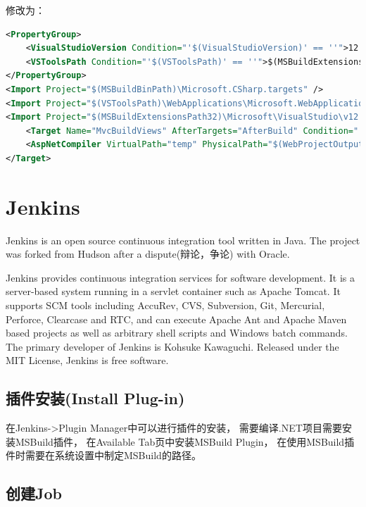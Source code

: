 \documentclass{book}
\begin{document}
修改为：

\begin{lstlisting}[language=XML]
<PropertyGroup>
	<VisualStudioVersion Condition="'$(VisualStudioVersion)' == ''">12.0</VisualStudioVersion>
	<VSToolsPath Condition="'$(VSToolsPath)' == ''">$(MSBuildExtensionsPath32)\Microsoft\VisualStudio\v$(VisualStudioVersion)</VSToolsPath>
</PropertyGroup>
<Import Project="$(MSBuildBinPath)\Microsoft.CSharp.targets" />
<Import Project="$(VSToolsPath)\WebApplications\Microsoft.WebApplication.targets" Condition="'$(Solutions.VSVersion)' == '12.0'" />
<Import Project="$(MSBuildExtensionsPath32)\Microsoft\VisualStudio\v12.0\WebApplications\Microsoft.WebApplication.targets" Condition="'$(Solutions.VSVersion)' == '12.0'" />
	<Target Name="MvcBuildViews" AfterTargets="AfterBuild" Condition="'$(MvcBuildViews)'=='true'">
	<AspNetCompiler VirtualPath="temp" PhysicalPath="$(WebProjectOutputDir)" />
</Target>
\end{lstlisting}

\section{Jenkins}

Jenkins is an open source continuous integration tool written in Java. 
The project was forked from Hudson after a dispute(辩论，争论) with Oracle.

Jenkins provides continuous integration services for software development. 
It is a server-based system running in a servlet container such as Apache Tomcat. 
It supports SCM tools including AccuRev, CVS, Subversion, Git, Mercurial, Perforce, 
Clearcase and RTC, and can execute Apache Ant and Apache Maven based projects 
as well as arbitrary shell scripts and Windows batch commands. 
The primary developer of Jenkins is Kohsuke Kawaguchi.
Released under the MIT License, Jenkins is free software.

\subsection{插件安装(Install Plug-in)}

在Jenkins->Plugin Manager中可以进行插件的安装，
需要编译.NET项目需要安装MSBuild插件，
在Available Tab页中安装MSBuild Plugin，
在使用MSBuild插件时需要在系统设置中制定MSBuild的路径。

\subsection{创建Job}
\end{document}
